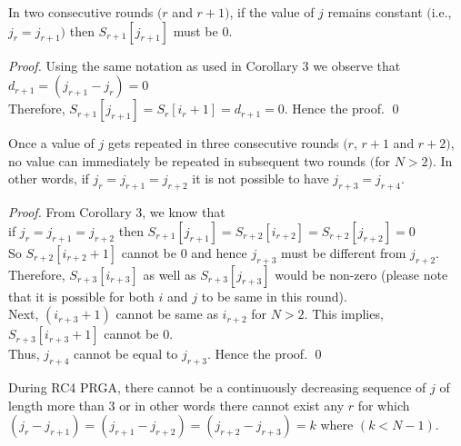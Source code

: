 \documentclass{llncs}
\begin{document}
\begin{corollary}

In two consecutive rounds $(r$ and $r+1)$, if the value of $j$ remains constant $($i.e., $j_{r}=j_{r+1})$ then $S_{r+1}[j_{r+1}]$ must be $0$.

\end{corollary} 

\begin{proof}
Using the same notation as used in Corollary 3 we observe that 
$d_{r+1} = (j_{r+1} - j_{r}) = 0$\\

Therefore, $S_{r+1}[j_{r+1}] = S_r[i_{r}+1] = d_{r+1} = 0$. Hence the proof. \qed

\end{proof}

\begin{corollary}

Once a value of $j$ gets repeated in three consecutive rounds $(r$, $r+1$ and $r+2)$, no value can immediately be repeated in subsequent two rounds $($for $N>2)$. In other words, if $j_{r}=j_{r+1}=j_{r+2}$ it is not possible to have $j_{r+3}=j_{r+4}$.

\end{corollary} 

\begin{proof}
\noindent From Corollary 3, we know that \\

if $j_{r}=j_{r+1}=j_{r+2}$ then $S_{r+1}[j_{r+1}] = S_{r+2}[i_{r+2}] = S_{r+2}[j_{r+2}] = 0$ \\

\noindent So $S_{r+2}[i_{r+2}+1]$ cannot be $0$ and hence  $j_{r+3}$ must be different from  $j_{r+2}$. \\

Therefore, $S_{r+3}[i_{r+3}]$ as well as $S_{r+3}[j_{r+3}]$ would be non-zero (please note that it is possible for both $i$ and $j$ to be same in this round).\\

\noindent Next, $(i_{r+3}+1)$ cannot be same as $i_{r+2}$ for $N>2$. This implies, $S_{r+3}[i_{r+3}+1]$ cannot be $0$. \\

\noindent Thus, $j_{r+4}$ cannot be equal to $j_{r+3}$. Hence the proof. \qed

\end{proof}

\begin{theorem}

During RC4 PRGA, there cannot be a continuously decreasing sequence of $j$ of length more than $3$ or in other words there cannot exist any $r$ for which $(j_{r} - j_{r+1}) = (j_{r+1} - j_{r+2}) = (j_{r+2} - j_{r+3}) = k$ where $(k < N-1)$. 

\end{theorem} 
\end{document}
